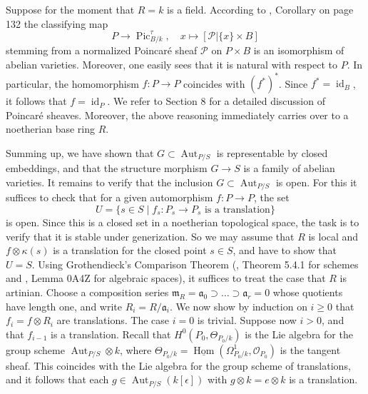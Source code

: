 \documentclass[oneside, 12pt]{amsart}
\theoremstyle{definition}
\theoremstyle{remark}
\newcommand{\ideala}{\mathfrak{a}}
\newcommand{\shP}{\mathscr{P}}
\newcommand{\Aut}{\operatorname{Aut}}
\newcommand{\id}{{\operatorname{id}}}
\newcommand{\lra}{\longrightarrow}
\newcommand{\maxid}{\mathfrak{m}}
\renewcommand{\O}{\mathscr{O}}
\newcommand{\Pic}{\operatorname{Pic}}
\newcommand{\ra}{\rightarrow}
\newcommand{\uHom}{\underline{\operatorname{Hom}}}
\begin{document}
Suppose for the moment that $R=k$ is a field.
According to \cite{Mumford 1970},   Corollary on page 132 the classifying map 
$$
P\lra \Pic^\tau_{B/k},\quad x\longmapsto [\shP|\{x\}\times B]
$$
stemming from a normalized Poincar\'e sheaf $\shP$ on $P\times B$ is an isomorphism
of abelian varieties. 
Moreover, one easily sees that it is natural with respect to $P$.
In particular, the homomorphism $f:P\ra P$ coincides with $(f^*)^*$.
Since $f^*=\id_B$, it follows that $f=\id_P$.
We refer to Section 8 for a detailed discussion  of Poincar\'e sheaves.
Moreover, the above  reasoning immediately carries  over to a noetherian base ring $R$.
% 

Summing up, we have shown  that $G\subset\Aut_{P/S}$ is representable by closed embeddings,
and that the structure morphism $G\ra S$ is a family of abelian varieties.
It remains to verify that the inclusion $G\subset\Aut_{P/S}$ is open.
For this it suffices to check that for a given automorphism  $f:P\ra P$, the   set
$$
U=\{s\in S\mid \text{$f_s:P_s\ra P_s$ is a translation}\}
$$
is   open. Since this is a closed set in a noetherian topological space, the task is  to verify
that it is stable under generization.
So we may assume that $R$ is local and    $f\otimes\kappa(s)$ is a translation for the closed point $s\in S$, and have to show
that $U=S$.
Using Grothendieck's Comparison Theorem (\cite{EGA IIIa}, Theorem 5.4.1 for schemes  and \cite{SP}, 
Lemma 0A4Z for algebraic spaces), 
it suffices to treat the case that $R$ is artinian. 
Choose a composition series $\maxid_R=\ideala_0\supset\ldots\supset\ideala_r=0$ whose quotients have length one,
and write $R_i=R/\ideala_i$.
We now show by induction on $i\geq 0$ that $f_i=f\otimes R_i$ are translations. The case $i=0$ is trivial.
Suppose now $i>0$, and that $f_{i-1}$ is a translation.
Recall that $H^0(P_0,\Theta_{P_0/k})$ is the Lie algebra for the group scheme $\Aut_{P/S}\otimes k$,
where $\Theta_{P_0/k}=\uHom(\Omega^1_{P_0/k},\O_{P_0})$ is the tangent sheaf. This coincides with the Lie algebra for the group scheme of translations, and it 
follows that each  $g\in\Aut_{P/S}(k[\epsilon])$ with $g\otimes k=e\otimes k$ is a translation.
\end{document}
